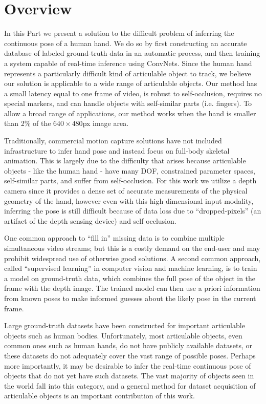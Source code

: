\chapter{Overview\label{chap:1_hand_tracking_overview}}

In this Part we present a solution to the difficult problem of inferring the continuous pose of a human hand. We do so by first constructing an accurate database of labeled ground-truth data in an automatic process, and then training a system capable of real-time inference using ConvNets. Since the human hand represents a particularly difficult kind of articulable object to track, we believe our solution is applicable to a wide range of articulable objects. Our method has a small latency equal to one frame of video, is robust to self-occlusion, requires no special markers, and can handle objects with self-similar parts (i.e. fingers). To allow a broad range of applications, our method works when the hand is smaller than 2\% of the $640\times480$px image area.

Traditionally, commercial motion capture solutions have not included infrastructure to infer hand pose and instead focus on full-body skeletal animation. This is largely due to the difficulty that arises because articulable objects - like the human hand - have many DOF, constrained parameter spaces, self-similar parts, and suffer from self-occlusion. For this work we utilize a depth camera since it provides a dense set of accurate measurements of the physical geometry of the hand, however even with this high dimensional input modality, inferring the pose is still difficult because of data loss due to ``dropped-pixels'' (an artifact of the depth sensing device) and self occlusion.

One common approach to ``fill in'' missing data is to combine multiple simultaneous video streams; but this is a costly demand on the end-user and may prohibit widespread use of otherwise good solutions. A second common approach, called ``supervised learning'' in computer vision and machine learning, is to train a model on ground-truth data, which combines the full pose of the object in the frame with the depth image. The trained model can then use a priori information from known poses to make informed guesses about the likely pose in the current frame.

Large ground-truth datasets have been constructed for important articulable objects such as human bodies. Unfortunately, most articulable objects, even common ones such as human hands, do not have publicly available datasets, or these datasets do not adequately cover the vast range of possible poses. Perhaps more importantly, it may be desirable to infer the real-time continuous pose of objects that do not yet have such datasets. The vast majority of objects seen in the world fall into this category, and a general method for dataset acquisition of articulable objects is an important contribution of this work.

